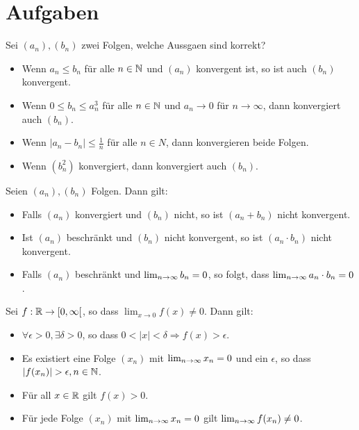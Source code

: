 \section{Aufgaben}



Sei $(a_n), (b_n)$ zwei Folgen, welche Aussgaen sind korrekt?
\begin{itemize}
    \item[$\square$]
    Wenn $a_n \leq b_n$ für alle $n \in \mathbb{N}$ und $(a_n)$ konvergent ist, so ist auch $(b_n)$ konvergent.
    \item[\rlap{\raisebox{0.3ex}{\hspace{0.4ex}\tiny \ding{52}}}$\square$]
    Wenn $0 \leq b_n \leq a^3_n$ für alle $n \in \mathbb{N}$ und $a_n \to 0$ für $n \to \infty$, dann
    konvergiert auch $(b_n)$.
    \item[$\square$]
    Wenn $|a_n - b_n| \leq \frac{1}{n}$ für alle $n \in N$, dann konvergieren beide Folgen.
    \item[$\square$]
    Wenn $(b^2_n)$ konvergiert, dann konvergiert auch $(b_n)$.
\end{itemize}

Seien $(a_n), (b_n)$ Folgen. Dann gilt:
\begin{itemize}
    \item[\rlap{\raisebox{0.3ex}{\hspace{0.4ex}\tiny \ding{52}}}$\square$]
    Falls $(a_n)$ konvergiert und $(b_n)$ nicht, so ist $(a_n + b_n)$ nicht konvergent.
    \item[$\square$]
    Ist $(a_n)$ beschränkt und $(b_n)$ nicht konvergent, so ist $(a_n \cdot b_n)$ nicht konvergent.
    \item[\rlap{\raisebox{0.3ex}{\hspace{0.4ex}\tiny \ding{52}}}$\square$]
    Falls $(a_n)$ beschränkt und $\lim_{n \rightarrow \infty} b_n = 0$, so folgt, dass $\lim_{n \rightarrow \infty} a_n \cdot b_n = 0$. 
\end{itemize}

Sei $f : \mathbb{R} \to [0, \infty[$, so dass $\lim_{x \to 0}f(x) \neq 0$. Dann gilt:
\begin{itemize}
    \item[$\square$]
    $\forall \epsilon > 0, \exists \delta > 0$, so dass $0 < |x| <\delta \Rightarrow f(x) > \epsilon$.
    \item[\rlap{\raisebox{0.3ex}{\hspace{0.4ex}\tiny \ding{52}}}$\square$]
    Es existiert eine Folge $(x_n)$ mit $\lim_{n \rightarrow \infty} x_n = 0$ und ein $\epsilon$, so dass $|f(x_n)| > \epsilon, n \in \mathbb{N}$.
    \item[\rlap{\raisebox{0.3ex}{\hspace{0.4ex}\tiny \ding{52}}}$\square$]
    Für all $x \in \mathbb{R}$ gilt $f(x) > 0$.
    \item[$\square$]
    Für jede Folge $(x_n)$ mit $\lim_{n \rightarrow \infty} x_n = 0$ gilt $\lim_{n \rightarrow \infty} f(x_n) \neq 0$.
\end{itemize}

